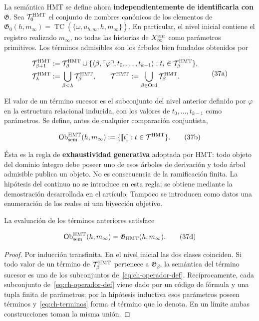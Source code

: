La semántica HMT se define ahora \textbf{independientemente de identificarla con \(\mathfrak G\)}. Sea \(\mathcal T_0^{\rm HMT}\) el conjunto de nombres
canónicos de los elementos de
\(\mathfrak G_0(h,m_\infty)=
\operatorname{TC}(\{\omega,u_{h,m},h,m_\infty\})\). En particular, el nivel
inicial contiene el registro realizado \(m_\infty\), no todas las historias de
\(X_\infty^{\rm enr}\) como parámetros primitivos.
Los términos admisibles son los árboles bien fundados obtenidos por

\[
 \begin{aligned}
 \mathcal T^{\rm HMT}_{\beta+1}
 &:={\mathcal T}^{\rm HMT}_\beta\cup
 \{\langle\beta,\ulcorner\varphi\urcorner,
       t_0,\ldots,t_{k-1}\rangle:
       t_i\in\mathcal T^{\rm HMT}_\beta\},\\
 \mathcal T^{\rm HMT}_\lambda&:=
       \bigcup_{\beta<\lambda}\mathcal T^{\rm HMT}_\beta,
 \qquad
 \mathcal T^{\rm HMT}:=
       \bigcup_{\beta\in\operatorname{Ord}}\mathcal T^{\rm HMT}_\beta.
 \end{aligned}
\tag{37a}\label{eq:ch-terminos}
\]

El valor de un término sucesor es el subconjunto del nivel anterior definido
por \(\varphi\) en la estructura relacional inducida, con los valores de
\(t_0,\ldots,t_{k-1}\) como parámetros. Se define, antes de cualquier
comparación conjuntista,

\[
 \operatorname{Ob}_{\rm sem}^{\rm HMT}(h,m_\infty)
 :=\{\llbracket t\rrbracket:t\in\mathcal T^{\rm HMT}\}.
\tag{37b}\label{eq:ch-objetos-semanticos}
\]

Ésta es la regla de \textbf{exhaustividad generativa} adoptada por HMT: todo
objeto del dominio íntegro debe poseer uno de esos árboles de derivación y todo
árbol admisible publica un objeto. No es consecuencia de la ramificación
finita. La hipótesis del continuo no se introduce en esta regla; se obtiene
mediante la demostración desarrollada en el artículo. Tampoco se introducen
como datos una enumeración de los reales ni una biyección objetivo.

\begin{theorem}
\label{thm:ch-6a}
La evaluación de
los términos anteriores satisface

\[
 \operatorname{Ob}_{\rm sem}^{\rm HMT}(h,m_\infty)
 =\mathfrak G_{\rm HMT}(h,m_\infty).
\tag{37d}\label{eq:ch-equivalencia-semantica}
\]

\end{theorem}
\begin{proof}
Por inducción transfinita. En el nivel inicial las dos clases
coinciden. Si todo valor de un término de
\(\mathcal T^{\rm HMT}_\beta\) pertenece a
\(\mathfrak G_\beta\), la semántica del término sucesor es uno de los
subconjuntos de~\eqref{eq:ch-operador-def}. Recíprocamente, cada subconjunto de~\eqref{eq:ch-operador-def} viene dado por
un código de fórmula y una tupla finita de parámetros; por la hipótesis
inductiva esos parámetros poseen términos y~\eqref{eq:ch-terminos} forma el término que lo
denota. En un límite ambas construcciones toman la misma unión.
\end{proof}

